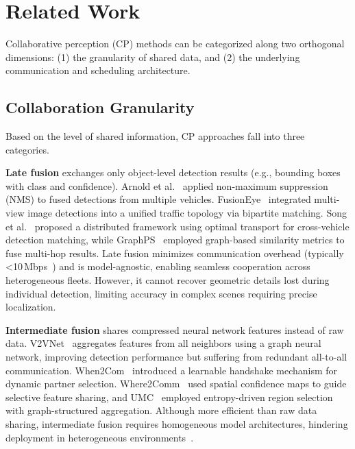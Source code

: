 \documentclass[conference]{IEEEtran}
\begin{document}
\section{Related Work}
\label{sec:related}

Collaborative perception (CP) methods can be categorized along two orthogonal dimensions: (1) the granularity of shared data, and (2) the underlying communication and scheduling architecture.

\subsection{Collaboration Granularity}

Based on the level of shared information, CP approaches fall into three categories.

\textbf{Late fusion} exchanges only object-level detection results (e.g., bounding boxes with class and confidence). Arnold et al.~\cite{arnold2020nmsLate} applied non-maximum suppression (NMS) to fused detections from multiple vehicles. FusionEye~\cite{liu2019fusioneyeLate} integrated multi-view image detections into a unified traffic topology via bipartite matching. Song et al.~\cite{song2023late} proposed a distributed framework using optimal transport for cross-vehicle detection matching, while GraphPS~\cite{li2023graphps} employed graph-based similarity metrics to fuse multi-hop results. Late fusion minimizes communication overhead (typically \textless 10\,Mbps~\cite{li2023hetSDN}) and is model-agnostic, enabling seamless cooperation across heterogeneous fleets. However, it cannot recover geometric details lost during individual detection, limiting accuracy in complex scenes requiring precise localization.

\textbf{Intermediate fusion} shares compressed neural network features instead of raw data. V2VNet~\cite{wang2020v2vnet} aggregates features from all neighbors using a graph neural network, improving detection performance but suffering from redundant all-to-all communication. When2Com~\cite{liu2020when2com} introduced a learnable handshake mechanism for dynamic partner selection. Where2Comm~\cite{hu2022where2comm} used spatial confidence maps to guide selective feature sharing, and UMC~\cite{wang2023umc} employed entropy-driven region selection with graph-structured aggregation. Although more efficient than raw data sharing, intermediate fusion requires homogeneous model architectures, hindering deployment in heterogeneous environments~\cite{li2023hetSDN}.
\end{document}
